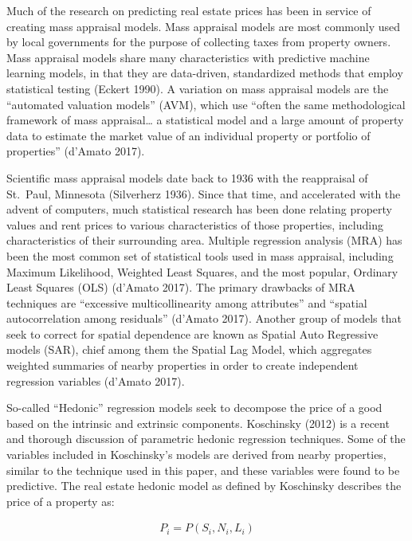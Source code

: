 \documentclass[12pt,]{article}
\begin{document}
Much of the research on predicting real estate prices has been in
service of creating mass appraisal models. Mass appraisal models are
most commonly used by local governments for the purpose of collecting
taxes from property owners. Mass appraisal models share many
characteristics with predictive machine learning models, in that they
are data-driven, standardized methods that employ statistical testing
(Eckert 1990). A variation on mass appraisal models are the ``automated
valuation models'' (AVM), which use ``often the same methodological
framework of mass appraisal\ldots{} a statistical model and a large
amount of property data to estimate the market value of an individual
property or portfolio of properties'' (d'Amato 2017).

Scientific mass appraisal models date back to 1936 with the reappraisal
of St.~Paul, Minnesota (Silverherz 1936). Since that time, and
accelerated with the advent of computers, much statistical research has
been done relating property values and rent prices to various
characteristics of those properties, including characteristics of their
surrounding area. Multiple regression analysis (MRA) has been the most
common set of statistical tools used in mass appraisal, including
Maximum Likelihood, Weighted Least Squares, and the most popular,
Ordinary Least Squares (OLS) (d'Amato 2017). The primary drawbacks of
MRA techniques are ``excessive multicollinearity among attributes'' and
``spatial autocorrelation among residuals'' (d'Amato 2017). Another
group of models that seek to correct for spatial dependence are known as
Spatial Auto Regressive models (SAR), chief among them the Spatial Lag
Model, which aggregates weighted summaries of nearby properties in order
to create independent regression variables (d'Amato 2017).

So-called ``Hedonic'' regression models seek to decompose the price of a
good based on the intrinsic and extrinsic components. Koschinsky (2012)
is a recent and thorough discussion of parametric hedonic regression
techniques. Some of the variables included in Koschinsky's models are
derived from nearby properties, similar to the technique used in this
paper, and these variables were found to be predictive. The real estate
hedonic model as defined by Koschinsky describes the price of a property
as:

\[
\begin{aligned}
 P_i = P(S_i, N_i, L_i)
\end{aligned}
\]
\end{document}
